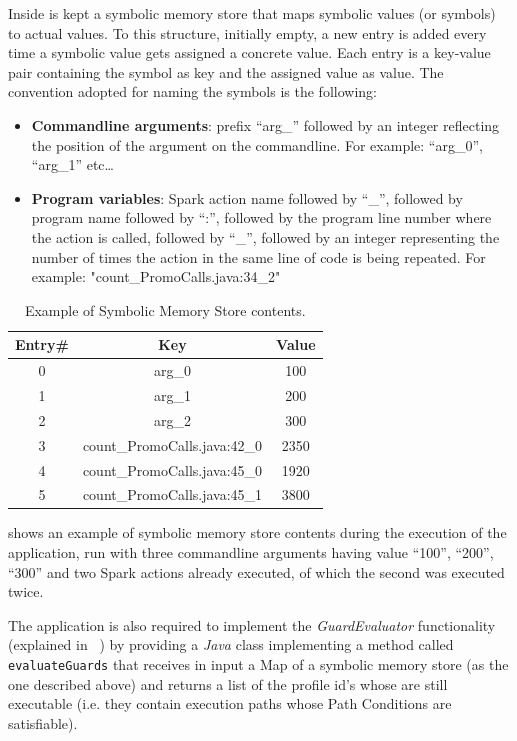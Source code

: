 Inside \tool is kept a symbolic memory store that maps symbolic values (or symbols) to actual values. To this structure, initially empty, a new entry is added every time a symbolic value gets assigned a concrete value. Each entry is a key-value pair containing the symbol as key and the assigned value as value. The convention adopted for naming the symbols is the following:
\begin{itemize}
	\item \textbf{Commandline arguments}: prefix “arg\_” followed by an integer reflecting the position of the argument on the commandline. For example: “arg\_0”, “arg\_1” etc…
	\item \textbf{Program variables}: Spark action name followed by “\_”, followed by program name followed by “:”, followed by the program line number where the action is called, followed by “\_”, followed by an integer representing the number of times the action in the same line of code is being repeated. For example: "count\_PromoCalls.java:34\_2"
\end{itemize} 
\begin{table}[tbhp]
	\centering
	\caption{Example of Symbolic Memory Store contents.}
	\label{Table:impl_symbolic_memory_store_contents}
	\begin{tabular}{|c|c|c|}
		\hline
		\textbf{Entry\#} & \textbf{Key} & \textbf{Value} \\ \hline
		0	& arg\_0						&  100      \\ \hline
		1	& arg\_1						&  200      \\ \hline
		2	& arg\_2						&  300      \\ \hline
		3	& count\_PromoCalls.java:42\_0	& 2350      \\ \hline
		4	& count\_PromoCalls.java:45\_0	& 1920      \\ \hline
		5	& count\_PromoCalls.java:45\_1	& 3800      \\ \hline
	\end{tabular}
\end{table}
 shows an example of symbolic memory store contents during the execution of the application, run with three commandline arguments having value “100”, “200”, “300” and two Spark actions already executed, of which the second was executed twice.

The application is also required to implement the \textit{GuardEvaluator} functionality (explained in ~) by providing a \textit{Java} class implementing a method called \texttt{evaluateGuards} that receives in input a Map of a symbolic memory store (as the one described above) and returns a list of the profile id’s whose \plans are still executable (i.e. they contain execution paths whose Path Conditions are satisfiable).

